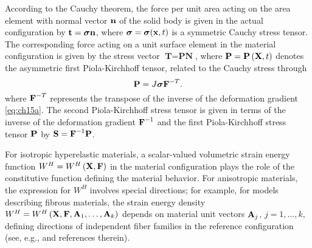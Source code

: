 \documentclass[11pt,letter,subeqn,fleqn]{article}
\numberwithin{equation}{section}
\numberwithin{table}{section}
\numberwithin{figure}{section}
\def\vec#1{{\boldsymbol{\rm #1}}} %
\def\tens#1{{\boldsymbol{\rm #1}}} %
\def\vec#1{{\boldsymbol{\rm #1}}} %
\def\tens#1{{\boldsymbol{\rm #1}}} %
\begin{document}
According to the Cauchy theorem, the force per unit area acting on the area element with normal vector $\vec{n}$ of the solid body is given in the actual configuration  by $\vec{t}=\tens{\sigma}\vec{n}$, where $\tens{\sigma}=\tens{\sigma} (\vec{x},t)$ is a symmetric Cauchy stress tensor. The corresponding force acting on a unit surface element in the material configuration is given by the stress vector $\textbf{T}=\textbf{P}\textbf{N}$, where $\vec{P}=\vec{P}\left(\vec{X}, t\right)$ denotes the asymmetric first Piola-Kirchhoff tensor, related to the Cauchy stress through
\begin{equation}\label{eq:ch123}
\vec{P}=J\boldsymbol{\sigma} \vec{F}^{-T}.
\end{equation}
where  $\vec{F}^{-T}$ represents the transpose of the inverse of the deformation gradient \eqref{eq:ch15a}. The second Piola-Kirchhoff stress tensor is given in terms of the inverse of the deformation gradient $\vec{F}^{-1}$ and the first Piola-Kirchhoff stress tensor $\vec{P}$ by $\tens{S}=\tens{F}^{-1}\tens{P}$.

For isotropic hyperelastic materials, a scalar-valued volumetric strain energy function $W^H= W^H\left({\bf X},{\bf F}\right)$ in the material configuration plays the role of the constitutive function defining the material behavior. For anisotropic materials, the expression for $W^H$ involves special directions; for example, for models describing fibrous materials, the strain energy density $W^H = W^H\left(\vec{X},{\bf F}, \vec{A}_1,\ldots,\vec{A}_k\right)$ depends on material unit vectors ${\vec{A}_j}$, $j=1,\ldots,k$, defining directions of independent fiber families in the reference configuration (see, e.g., \cite{cheviakov2016one} and references therein).
\end{document}
